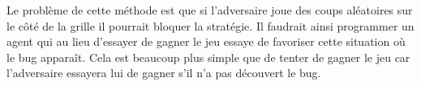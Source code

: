 \documentclass[12pt]{article}
\begin{document}
Le problème de cette méthode est que si l'adversaire joue des coups aléatoires sur le côté de la grille il pourrait bloquer la stratégie. Il faudrait ainsi programmer un agent qui au lieu d'essayer de gagner le jeu essaye de favoriser cette situation où le bug apparaît. Cela est beaucoup plus simple que de tenter de gagner le jeu car l'adversaire essayera lui de gagner s'il n'a pas découvert le bug. 
\end{document}
